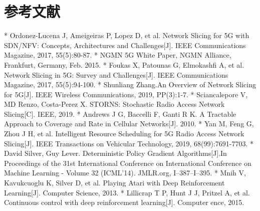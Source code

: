 \section{参考文献}
	* Ordonez-Lucena J, Ameigeiras P, Lopez D, et al. Network Slicing for 5G with SDN/NFV: Concepts, Architectures and Challenges[J]. IEEE Communications Magazine, 2017, 55(5):80-87.
	* NGMN 5G White Paper, NGMN Alliance, Frankfurt, Germany, Feb. 2015.
	* Foukas X, Patounas G, Elmokashfi A, et al. Network Slicing in 5G: Survey and Challenges[J]. IEEE Communications Magazine, 2017, 55(5):94-100.
	* Shunliang Zhang.An Overview of Network Slicing for 5G[J]. IEEE Wireless Communications, 2019, PP(3):1-7.
	* Sciancalepore V, MD Renzo, Costa-Perez X. STORNS: Stochastic Radio Access Network Slicing[C]. IEEE, 2019.
	* Andrews J G, Baccelli F, Ganti R K. A Tractable Approach to Coverage and Rate in Cellular Networks[J]. 2010.
	* Yan M, Feng G, Zhou J H, et al. Intelligent Resource Scheduling for 5G Radio Access Network Slicing[J]. IEEE Transactions on Vehicular Technology, 2019, 68(99):7691-7703.
	* David Silver, Guy Lever. Deterministic Policy Gradient Algorithms[J].In Proceedings of the 31st International Conference on International Conference on Machine Learning - Volume 32 (ICML'14). JMLR.org, I–387–I–395.
	* Mnih V, Kavukcuoglu K, Silver D, et al. Playing Atari with Deep Reinforcement Learning[J]. Computer Science, 2013.
	* Lillicrap T P, Hunt J J, Pritzel A, et al. Continuous control with deep reinforcement learning[J]. Computer ence, 2015.
	
